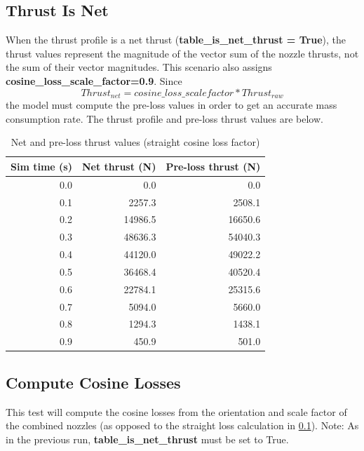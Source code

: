 \documentclass[11pt,fleqn]{report}
\begin{document}
\subsection{Thrust Is Net}\label{sec:MultiNoz2}
When the thrust profile is a net thrust (\textbf{table\_is\_net\_thrust = True}), the thrust values represent the magnitude of the vector sum of the nozzle thrusts, not the sum of their vector magnitudes.  This scenario also assigns \textbf{cosine\_loss\_scale\_factor=0.9}.  Since 
$$Thrust_{net} = cosine\_loss\_scalefactor * Thrust_{raw}$$  the model must compute the pre-loss values in order to get an accurate mass consumption rate.  The thrust profile and pre-loss thrust values are below.
\begin{longtable}{|r|r|r|}
\caption{Net and pre-loss thrust values (straight cosine loss factor)}\\
\hline
\textbf{Sim time (s)} & \textbf{Net thrust (N)} & \textbf{Pre-loss thrust (N)}\\
\hline
\endhead

0.0 & 0.0 & 0.0 \\ \hline
0.1 & 2257.3 & 2508.1 \\ \hline
0.2 & 14986.5 & 16650.6 \\ \hline
0.3 & 48636.3 & 54040.3 \\ \hline
0.4 & 44120.0 & 49022.2 \\ \hline
0.5 & 36468.4 & 40520.4 \\ \hline
0.6 & 22784.1 & 25315.6 \\ \hline
0.7 & 5094.0 & 5660.0 \\ \hline
0.8 & 1294.3 & 1438.1 \\ \hline
0.9 & 450.9 & 501.0 \\ \hline
\end{longtable}

\subsection{Compute Cosine Losses}\label{sec:MultiNoz3}
This test will compute the cosine losses from the orientation and scale factor of the combined nozzles (as opposed to the straight loss calculation in \ref{sec:MultiNoz2}).  Note:  As in the previous run, \textbf{table\_is\_net\_thrust} must be set to True.
\end{document}
